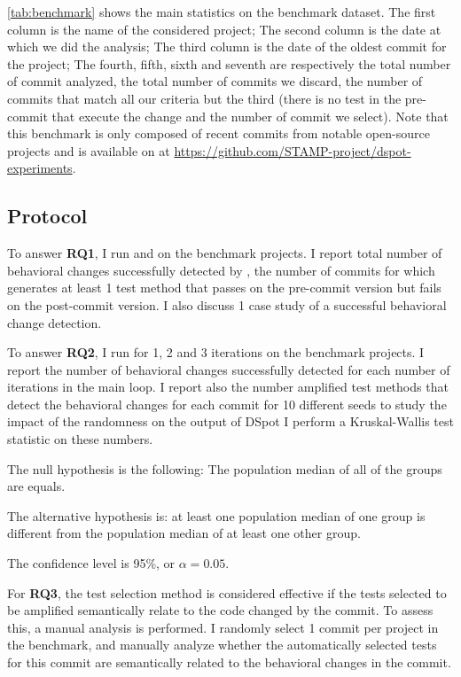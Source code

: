 \autoref{tab:benchmark} shows the main statistics on the benchmark dataset. %
The first column is the name of the considered project;
The second column is the date at which we did the analysis;
The third column is the date of the oldest commit for the project;
The fourth, fifth, sixth and seventh are respectively the total number of commit analyzed, the total number of commits we discard, the number of commits that match all our criteria but the third (there is no test in the pre-commit that execute the change and the number of commit we select).
Note that this benchmark is only composed of recent commits from notable open-source projects and is available on \gh at \url{https://github.com/STAMP-project/dspot-experiments}.

\subsection{Protocol}
\label{subsec:dci:evaluation:protocol}

To answer \textbf{RQ1}, I run \DCIA and \DCII on the benchmark projects.
I report total number of behavioral changes successfully detected by \DCI, \ie the number of commits for which \DCI generates at least 1 test method that passes on the pre-commit version but fails on the post-commit version.
I also discuss 1 case study of a successful behavioral change detection.

To answer \textbf{RQ2}, I run \DCII for 1, 2 and 3 iterations on the benchmark projects.
I report the number of behavioral changes successfully detected for each number of iterations in the main loop.
I report also the number amplified test methods that detect the behavioral changes for each commit for 10 different seeds to study the impact of the randomness on the output of DSpot
I perform a Kruskal-Wallis test statistic on these numbers.

The null hypothesis is the following: The population median of all of the groups are equals.

The alternative hypothesis is: at least one population median of one group is different from the population median of at least one other group.

The confidence level is 95\%, or $\alpha = 0.05$.

For \textbf{RQ3}, the test selection method is considered effective if the tests selected to be amplified semantically relate to the code changed by the commit. 
To assess this, a manual analysis is performed.%
I randomly select 1 commit per project in the benchmark, and manually analyze whether the automatically selected tests for this commit are semantically related to the behavioral changes in the commit. 

